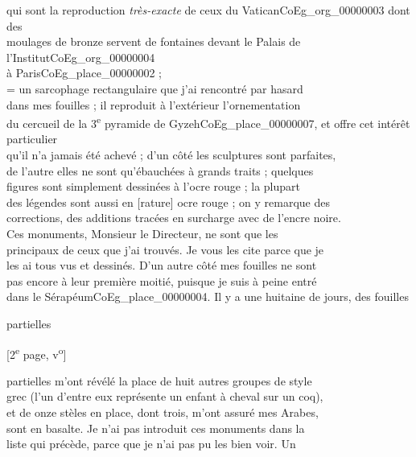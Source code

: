\documentclass{book}
\begin{document}
qui sont la reproduction \textit{très-exacte} de ceux du Vatican\gls{CoEg_org_00000003} dont des\\
moulages de bronze servent de fontaines devant le Palais de l’Institut\gls{CoEg_org_00000004}\\
à Paris\gls{CoEg_place_00000002} ;\\
 = un sarcophage rectangulaire que j’ai rencontré par hasard\\
dans mes fouilles ; il reproduit à l’extérieur l’ornementation\\
du cercueil de la 3\textsuperscript{e} pyramide de Gyzeh\gls{CoEg_place_00000007}, et offre cet intérêt particulier\\
qu’il n’a jamais été achevé ; d’un côté les sculptures sont parfaites,\\
de l’autre elles ne sont qu’ébauchées à grands traits ; quelques\\
figures sont simplement dessinées à l’ocre rouge ; la plupart\\
des légendes sont aussi en [rature] ocre rouge ; on y remarque des\\
corrections, des additions tracées en surcharge avec de l’encre noire.\\
\indent Ces monuments, Monsieur le Directeur, ne sont que les\\
principaux de ceux que j’ai trouvés. Je vous les cite parce que je\\
les ai tous vus et dessinés. D’un autre côté mes fouilles ne sont\\
pas encore à leur première moitié, puisque je suis à peine entré\\
dans le Sérapéum\gls{CoEg_place_00000004}. Il y a une huitaine de jours, des fouilles
\begin{flushright}partielles\end{flushright}
{\footnotesize \begin{center} [2\textsuperscript{e} page, v\textsuperscript{o}]\end{center}}
\noindent partielles m’ont révélé la place de huit autres groupes de style\\
grec (l’un d’entre eux représente un enfant à cheval sur un coq),\\
et de onze stèles en place, dont trois, m’ont assuré mes Arabes,\\
sont en basalte. Je n’ai pas introduit ces monuments dans la\\
liste qui précède, parce que je n’ai pas pu les bien voir. Un\\
\end{document}
